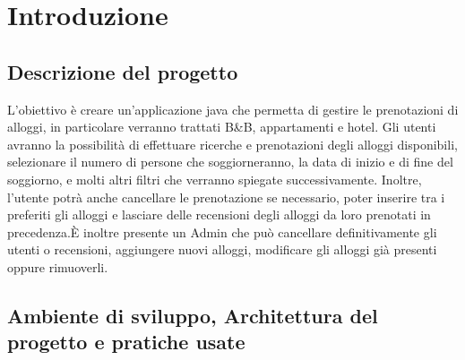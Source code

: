 \documentclass[10pt]{article}
\begin{document}
\newpage

\tableofcontents

\newpage

\section{Introduzione}

\subsection{Descrizione del progetto}

L'obiettivo è creare un'applicazione java che permetta di gestire le prenotazioni di alloggi, in particolare verranno trattati B\&B, appartamenti e hotel. Gli utenti avranno la possibilità di effettuare ricerche e prenotazioni degli alloggi disponibili, selezionare il numero di persone che soggiorneranno, la data di inizio e di fine del soggiorno, e molti altri filtri che verranno spiegate successivamente. Inoltre, l'utente potrà anche cancellare le prenotazione se necessario, poter inserire tra i preferiti gli alloggi e lasciare delle recensioni degli alloggi da loro prenotati in precedenza.\`E inoltre presente un Admin che può cancellare definitivamente gli utenti o recensioni, aggiungere nuovi alloggi, modificare gli alloggi già presenti oppure rimuoverli.

\subsection{Ambiente di sviluppo, Architettura del progetto e pratiche usate}
\end{document}

